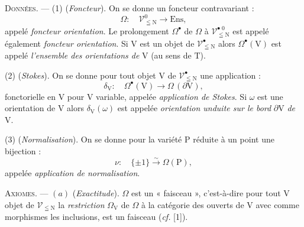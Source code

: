\textsc{Données}. --- (1) (\textit{Foncteur}). On se donne un foncteur contravariant :
\[
\Omega:\quad\mathscr{V}^{0}_{\leqq\mathrm{N}}\to\mathrm{Ens},
\]
appelé \textit{foncteur orientation}. Le prolongement $\Omega^{\bullet}$ de $\Omega$ à $\mathscr{V}^{\bullet\;0}_{\leqq\mathrm{N}}$ est appelé également \textit{foncteur orientation}. Si $\mathrm{V}$ est un objet de $\mathscr{V}^{\bullet}_{\leqq\mathrm{N}}$ alors $\Omega^{\bullet}(\mathrm{V})$ est appelé \textit{l'ensemble des orientations de} $\mathrm{V}$ (au sens de $\mathrm{T}$).

(2) (\textit{Stokes}). On se donne pour tout objet $\mathrm{V}$ de $\mathscr{V}^{\bullet}_{\leqq\mathrm{N}}$ une application :
\[
\delta_{\mathrm{V}}:\quad\Omega^{\bullet}(\mathrm{V})\to\Omega\,(\partial\mathrm{V}),
\]
fonctorielle en $\mathrm{V}$ pour $\mathrm{V}$ variable, appelée \textit{application de Stokes}. Si $\omega$ est une orientation de $\mathrm{V}$ alors $\delta_{\mathrm{V}}(\omega)$ est appelée \textit{orientation unduite sur le bord} $\partial\mathrm{V}$ \textit{de} $\mathrm{V}$.

(3) (\textit{Normalisation}). On se donne pour la variété $\mathrm{P}$ réduite à un point une bijection :
\[
\nu:\quad\{\pm1\}\overset{\sim}{\to}\Omega(\mathrm{P}),
\]
appelée \textit{application de normalisation}.

\textsc{Axiomes}. --- $(a)$ (\textit{Exactitude}). $\Omega$ est un « faisceau », c'est-à-dire pour tout $\mathrm{V}$ objet de $\mathscr{V}_{\leqq\mathrm{N}}$ la \textit{restriction} $\Omega_{\mathrm{V}}$ de $\Omega$ à la catégorie des ouverts de $\mathrm{V}$ avec comme morphismes les inclusions, est un faisceau (\textit{cf.} [1]).

